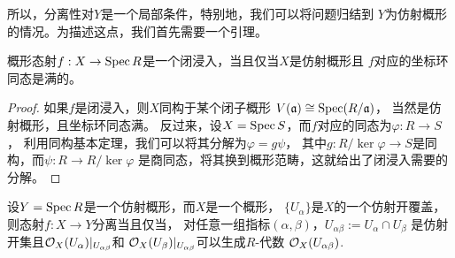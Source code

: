 所以，分离性对$Y$是一个局部条件，特别地，我们可以将问题归结到
$Y$为仿射概形的情况。为描述这点，我们首先需要一个引理。

\begin{lem}
概形态射$f:X\to \operatorname{Spec} R$是一个闭浸入，当且仅当$X$是仿射概形且
$f$对应的坐标环同态是满的。
\end{lem}

\begin{proof}
如果$f$是闭浸入，则$X$同构于某个闭子概形
$V(\mathfrak{a})\cong \operatorname{Spec} (R/\mathfrak a)$，
当然是仿射概形，且坐标环同态满。
反过来，设$X=\operatorname{Spec} S$，而$f$对应的同态为$\varphi:R\to S$，
利用同构基本定理，我们可以将其分解为$\varphi=g\psi$，
其中$g:R/\ker \varphi\to S$是同构，而$\psi:R\to R/\ker\varphi$
是商同态，将其换到概形范畴，这就给出了闭浸入需要的分解。
\end{proof}

\begin{pro}
设$Y=\operatorname{Spec} R$是一个仿射概形，而$X$是一个概形，
$\{U_\alpha\}$是$X$的一个仿射开覆盖，则态射$f:X\to Y$分离当且仅当，
对任意一组指标$(\alpha,\beta)$，$U_{\alpha\beta}:=U_\alpha\cap U_\beta$
是仿射开集且$\mathcal{O}_X(U_{\alpha})|_{U_{\alpha\beta}}$和
$\mathcal{O}_X(U_{\beta})|_{U_{\alpha\beta}}$可以生成$R$-代数
$\mathcal{O}_X(U_{\alpha\beta})$.
\end{pro}

